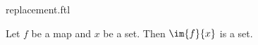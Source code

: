 \documentclass{stex}
\begin{document}
\begin{smodule}{replacement.ftl}


\begin{axiom}[forthel,title=Replacement Axiom,id=ReplacementAx]
  Let $f$ be a map and $x$ be a set.
  Then $\im{f}{x}$ is a set.
\end{axiom}

\end{smodule}
\end{document}
